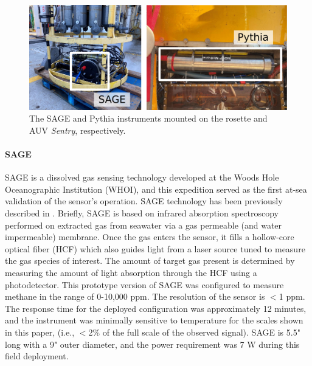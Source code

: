 \begin{figure}[h!]
    \centering
    \includegraphics[width=\columnwidth]{figures/chap3_methane_sensor_mounting.jpg}
    \caption{The SAGE and Pythia instruments mounted on the rosette and AUV \emph{Sentry}, respectively.}
    \label{fig:sensor_mounting}
\end{figure}


\paragraph{SAGE}
\label{sec:sage}
SAGE is a dissolved gas sensing technology developed at the Woods Hole Oceanographic Institution (WHOI), and this expedition served as the first at-sea validation of the sensor’s operation. SAGE technology has been previously described in \cite{kapit2021dissolved, kapit2021measurement}. Briefly, SAGE is based on infrared absorption spectroscopy performed on extracted gas from seawater via a gas permeable (and water impermeable) membrane. Once the gas enters the sensor, it fills a hollow-core optical fiber (HCF) which also guides light from a laser source tuned to measure the gas species of interest. The amount of target gas present is determined by measuring the amount of light absorption through the HCF using a photodetector. This prototype version of SAGE was configured to measure methane in the range of 0-10,000 ppm. The resolution of the sensor is $<$1 ppm. The response time for the deployed configuration was approximately 12 minutes, and the instrument was minimally sensitive to temperature for the scales shown in this paper, (i.e., $<$2\% of the full scale of the observed signal). SAGE is 5.5" long with a 9" outer diameter, and the power requirement was 7 W during this field deployment.


